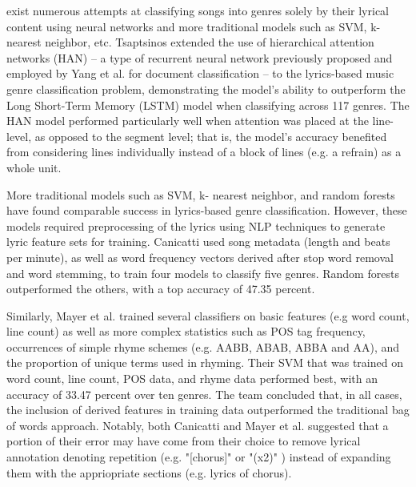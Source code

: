 \documentclass[journal]{IEEEtran}
\begin{document}
 exist numerous attempts at classifying songs into genres solely by their lyrical content using neural networks and more traditional models such as SVM, k-nearest neighbor, etc.
Tsaptsinos \cite{tsaptsinos} extended the use of hierarchical attention networks (HAN) -- a type of recurrent neural network previously proposed and employed by Yang et al. \cite{Yang} for document classification -- to the lyrics-based music genre classification problem, demonstrating the model's ability to outperform the Long Short-Term Memory (LSTM) model when classifying across 117 genres. The HAN model performed particularly well when attention was placed at the line-level, as opposed to the segment level; that is, the model's accuracy benefited from considering lines individually instead of a block of lines (e.g. a refrain) as a whole unit. \par

More traditional models such as SVM, k- nearest neighbor, and random forests have found comparable success in lyrics-based genre classification. However, these models required preprocessing of the lyrics using NLP techniques to generate lyric feature sets for training. Canicatti \cite{canicatti} used song metadata (length and beats per minute), as well as word frequency vectors derived after stop word removal and word stemming, to train four models to classify five genres. Random forests outperformed the others, with a top accuracy of 47.35 percent. \par

Similarly, Mayer et al. \cite{mayer} trained several classifiers on basic features (e.g word count, line count) as well as more complex statistics such as POS tag frequency, occurrences of simple rhyme schemes (e.g. AABB, ABAB, ABBA and AA), and the proportion of unique terms used in rhyming. Their SVM that was trained on word count, line count, POS data, and rhyme data performed best, with an accuracy of 33.47 percent over ten genres. The team concluded that, in all cases, the inclusion of derived features in training data outperformed the traditional bag of words approach. Notably, both Canicatti and Mayer et al. suggested that a portion of their error may have come from their choice to remove lyrical annotation denoting repetition (e.g. "[chorus]" or "(x2)" ) instead of expanding them with the appriopriate sections (e.g. lyrics of chorus). \\ \\ \\ \\ \\  \par
\end{document}

